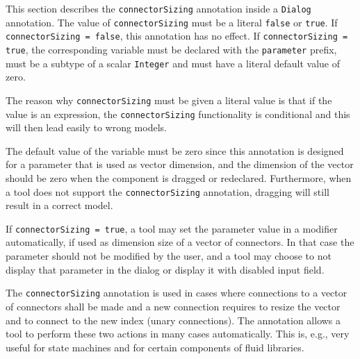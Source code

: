 This section describes the \lstinline!connectorSizing! annotation inside a \lstinline!Dialog! annotation.
The value of \lstinline!connectorSizing! must be a literal \lstinline!false! or \lstinline!true!.
If \lstinline!connectorSizing = false!, this annotation has no effect.
If \lstinline!connectorSizing = true!, the corresponding variable must be declared with the \lstinline!parameter! prefix, must be a subtype of a scalar \lstinline!Integer! and must have a literal default value of zero.

\begin{nonnormative}
The reason why \lstinline!connectorSizing! must be given a literal value is that if the value is an expression,
the \lstinline!connectorSizing! functionality is conditional and this will then lead easily to wrong models.

The default value of the variable must be zero since this annotation
is designed for a parameter that is used as vector dimension, and the
dimension of the vector should be zero when the component is dragged or
redeclared.  Furthermore, when a tool does not support the
\lstinline!connectorSizing! annotation, dragging will still result in a correct
model.
\end{nonnormative}

If \lstinline!connectorSizing = true!, a tool may set the parameter value in a modifier automatically, if used as dimension size of a vector of connectors.
In that case the parameter should not be modified by the user, and a tool may choose to not display that parameter in the dialog or display it with disabled input field.

\begin{nonnormative}
The \lstinline!connectorSizing! annotation is used in cases
where connections to a vector of connectors shall be made and a new
connection requires to resize the vector and to connect to the new index
(unary connections). The annotation allows a tool to perform these two
actions in many cases automatically. This is, e.g., very useful for
state machines and for certain components of fluid libraries.
\end{nonnormative}

